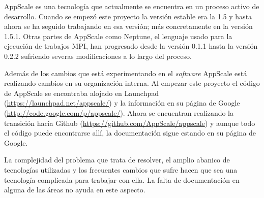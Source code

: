 AppScale es una tecnología que actualmente se encuentra en un proceso activo de desarrollo. Cuando se empezó este proyecto la versión estable era la 1.5 y hasta ahora se ha seguido trabajando en esa versión; más concretamente en la versión 1.5.1. Otras partes de AppScale como Neptune, el lenguaje usado para la ejecución de trabajos MPI, han progresado desde la versión 0.1.1 hasta la versión 0.2.2 sufriendo severas modificaciones a lo largo del proceso. 

Además de los cambios que está experimentando en el \emph{software} AppScale está realizando cambios en su organización interna. Al empezar este proyecto el código de AppScale se encontraba alojado en Launchpad (\url{https://launchpad.net/appscale/}) y la información en su página de Google (\url{http://code.google.com/p/appscale/}). Ahora se encuentran realizando la transición hacia Github (\url{https://github.com/AppScale/appscale}) y aunque todo el código puede encontrarse allí, la documentación sigue estando en su página de Google.

La complejidad del problema que trata de resolver, el amplio abanico de tecnologías utilizadas y los frecuentes cambios que sufre hacen que sea una tecnología complicada para trabajar con ella. La falta de documentación en alguna de las áreas no ayuda en este aspecto.
